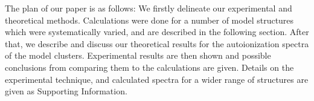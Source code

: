 The plan of our paper is as follows: We firstly delineate our experimental and theoretical methods. 
Calculations were done for a number of model structures which were systematically varied, and are described in the following section.
After that, we describe and discuss our theoretical results for the autoionization spectra of the model clusters.
Experimental results are then shown and possible conclusions from comparing them to the calculations are given.
Details on the experimental technique, and calculated spectra for a wider range of structures are given as Supporting Information.



